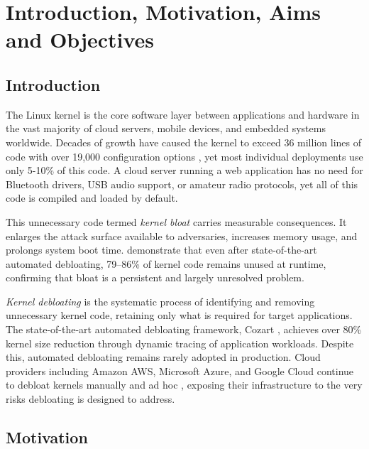 \documentclass[12pt, a4paper, oneside]{book}
\begin{document}
\chapter{Introduction, Motivation, Aims and Objectives}

\section{Introduction}

The Linux kernel is the core software layer between applications and hardware
in the vast majority of cloud servers, mobile devices, and embedded systems
worldwide. Decades of growth have caused the kernel to exceed 36 million lines
of code with over 19,000 configuration options \citep{gunasekaran2025lean},
yet most individual deployments use only 5-10\% of this code. A cloud server
running a web application has no need for Bluetooth drivers, USB audio support,
or amateur radio protocols, yet all of this code is compiled and loaded by default.

This unnecessary code termed \textit{kernel bloat} carries measurable
consequences. It enlarges the attack surface available to adversaries, increases
memory usage, and prolongs system boot time. \citet{gunasekaran2025lean}
demonstrate that even after state-of-the-art automated debloating, 79--86\% of
kernel code remains unused at runtime, confirming that bloat is a persistent and
largely unresolved problem.

\textit{Kernel debloating} is the systematic process of identifying and removing
unnecessary kernel code, retaining only what is required for target applications.
The state-of-the-art automated debloating framework, Cozart \citep{kuo2020cozart},
achieves over 80\% kernel size reduction through dynamic tracing of application
workloads. Despite this, automated debloating remains rarely adopted in production.
Cloud providers including Amazon AWS, Microsoft Azure, and Google Cloud continue
to debloat kernels manually and ad hoc \citep{kuo2020cozart}, exposing their
infrastructure to the very risks debloating is designed to address.

\section{Motivation}
\end{document}
